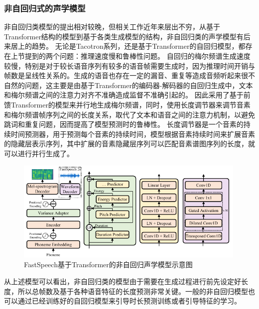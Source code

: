 \subsubsection{非自回归式的声学模型}
非自回归类模型的提出相对较晚，但相关工作近年来层出不穷，从基于Transformer结构的模型到基于各类生成模型的结构，非自回归类的声学模型有后来居上的趋势。
无论是Tacotron系列，还是基于Transformer的自回归模型，都存在上节提到的两个问题：推理速度慢和鲁棒性问题。
自回归的梅尔频谱生成速度较慢，特别是对于较长语音序列有较多的语音帧需要生成时，因为推理时间开销与帧数是呈线性关系的。生成的语音也存在一定的漏音、重复等造成音频听起来很不自然的问题，这主要是由基于Transformer的编码器-解码器的自回归生成中，文本和梅尔频谱之间的注意力对齐不准确造成监督不准确引起的。
因此\citet{ren2019fastspeech}采用了基于前馈Transformer的模型来并行地生成梅尔频谱，同时，使用长度调节器来调节音素和梅尔频谱帧序列之间的长度关系，取代了文本和语音之间的注意力机制，以避免跳词和重复问题，因而提高了模型预测时的鲁棒性。
长度调节器是一个音素的持续时间预测器，用于预测每个音素的持续时间，模型根据音素持续时间来扩展音素的隐藏层表示序列，其中扩展的音素隐藏层序列可以匹配音素谱图序列的长度，就可以进行并行生成了。
\begin{figure}[htbp]
  \includegraphics[width=0.99\textwidth]{figure/related/fs2.pdf}
  \caption{FastSpeech\citep{ren2019fastspeech}基于Transformer的非自回归声学模型示意图}
\end{figure}
从上述模型可以看出，非自回归类的模型由于需要在生成过程进行前先设定好长度，所以总帧数及基于各种语音特征的长度预测非常关键。一般的非自回归模型也可以通过已经训练好的自回归模型来引导时长预测训练或者引导特征的学习。

